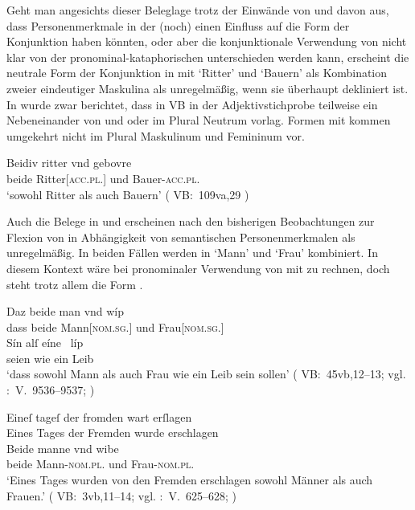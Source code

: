 Geht man angesichts dieser Beleglage trotz der Einwände von
\citet{gjelsten1980} und \citet{ksw2} davon aus, dass
Personenmerkmale in der \KC{} (noch) einen Einfluss auf die
Form der Konjunktion haben könnten, oder aber die konjunktionale Verwendung von
 nicht klar von der pronominal-kataphorischen
unterschieden werden kann, erscheint die neutrale Form der
Konjunktion in  mit  `Ritter' und
 `Bauern' als Kombination zweier eindeutiger Maskulina als
unregelmäßig, wenn sie überhaupt dekliniert ist. In
 wurde zwar berichtet, dass in VB in der
Adjektivstichprobe teilweise ein Nebeneinander von  und 
oder  im Plural Neutrum vorlag. Formen mit
 kommen umgekehrt nicht im Plural Maskulinum und Femininum vor.

\begin{exe}
\ex\label{ex:rittergebure}
	\gll Beidiv ritter vnd gebovre \\
		beide Ritter[\textsc{acc.pl.\MascM}] und Bauer-\textsc{acc.pl.\MascM} \\
	\trans `sowohl Ritter als auch Bauern'
		(%
			VB:~109va,29%
		)
\end{exe}

Auch die Belege in  und  erscheinen
nach den bisherigen Beobachtungen zur Flexion von  in Abhängigkeit
von semantischen Personenmerkmalen
als unregelmäßig. In beiden Fällen werden in
 `Mann' und `Frau' kombiniert. In diesem Kontext wäre bei
pronominaler Verwendung von  mit  zu
rechnen, doch steht trotz allem die Form .

\begin{exe}
\ex \label{ex:konjmixbeide1}
	\begin{xlist}
	\ex \gll Daz beide man vnd wíp \\
			dass beide Mann[\textsc{nom.sg.\MascM}] und Frau[\textsc{nom.sg.\NeutF}] \\
	\sn \gll Sín alſ eíne~ líp \\
			seien wie ein Leib \\
		\trans `dass sowohl Mann als auch Frau wie ein Leib sein sollen'
			(%
				VB:~45vb,12--13; vgl.
				\KC:~V.~9536--9537;
				\cite[257]{schroeder1895}
			)
		\label{ex:konjmixbeide1_1}

	\ex \label{ex:konjmixbeide1_2}
		\gll Eineſ tageſ der fromden wart erſlagen \\
			Eines Tages der Fremden wurde erschlagen \\
		\textelp{}
	\sn \gll Beide manne vnd wibe \\
			beide Mann-\textsc{nom.pl.\MascM} und Frau-\textsc{nom.pl.\NeutF} \\
		\trans `Eines Tages wurden von den Fremden erschlagen \textelp{} 
			sowohl Männer als auch Frauen.'
			(%
				VB:~3vb,11--14; vgl.
				\KC:~V.~625--628;
				\cite[93]{schroeder1895}%
			)
	\end{xlist}
\end{exe}

